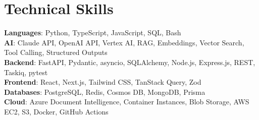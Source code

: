 \section{Technical Skills}
\begin{itemize}[leftmargin=0.15in, label={}]
    \small{\item{
        \textbf{Languages}{: Python, TypeScript, JavaScript, SQL, Bash} \\

        \textbf{AI}{: Claude API, OpenAI API, Vertex AI, RAG, Embeddings, Vector Search, Tool Calling, Structured Outputs} \\

        \textbf{Backend}{: FastAPI, Pydantic, asyncio, SQLAlchemy, Node.js, Express.js, REST, Taskiq, pytest} \\

        \textbf{Frontend}{: React, Next.js, Tailwind CSS, TanStack Query, Zod} \\

        \textbf{Databases}{: PostgreSQL, Redis, Cosmos DB, MongoDB, Prisma} \\

        \textbf{Cloud}{: Azure Document Intelligence, Container Instances, Blob Storage, AWS EC2, S3, Docker, GitHub Actions}
    }}
\end{itemize}
